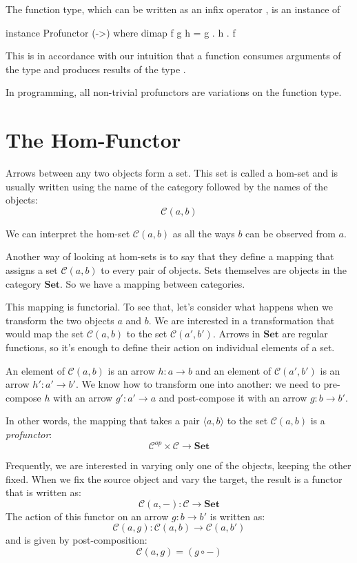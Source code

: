 \documentclass[DaoFP]{subfiles}
\begin{document}
The function type, which can be written as an infix operator \hask{(->)}, is an instance of 
\begin{haskell}
instance Profunctor (->) where
  dimap f g h = g . h . f
\end{haskell}
This is in accordance with our intuition that a function  consumes arguments of the type  and produces results of the type .

In programming, all non-trivial profunctors are variations on the function type. 

\section{The Hom-Functor}

Arrows between any two objects form a set. This set is called a hom-set and is usually written using the name of the category followed by the names of the objects:
\[ \mathcal{C}(a, b) \]

We can interpret the hom-set $\mathcal{C}(a, b)$ as all the ways $b$ can be observed from $a$. 

Another way of looking at hom-sets is to say that they define a mapping that assigns a set $\mathcal{C}(a, b)$ to every pair of objects. Sets themselves are objects in the category $\mathbf{Set}$. So we have a mapping between categories.

This mapping is functorial. To see that, let's consider what happens when we transform the two objects $a$ and $b$. We are interested in a transformation that would map the set $\mathcal{C}(a, b)$ to the set $\mathcal{C}(a', b')$. Arrows in $\mathbf{Set}$ are regular functions, so it's enough to define their action on individual elements of a set. 

An element of $\mathcal{C}(a, b)$ is an arrow $h \colon a \to b$ and an element of $\mathcal{C}(a', b')$ is an arrow $h' \colon a' \to b'$. We know how to transform one into another: we need to pre-compose $h$ with an arrow $g' \colon a' \to a$ and post-compose it with an arrow $g \colon b \to b'$. 

In other words, the mapping that takes a pair $\langle a, b \rangle$ to the set $\mathcal{C}(a, b)$ is a \emph{profunctor}:
\[ \mathcal{C}^{op} \times \mathcal{C} \to \mathbf{Set} \]

Frequently, we are interested in varying only one of the objects, keeping the other fixed. When we fix the source object and vary the target, the result is a functor  that is written as:
\[ \mathcal{C}(a, -) \colon \mathcal{C} \to \mathbf{Set} \]
The action of this functor on an arrow $g \colon b \to b'$ is written as:
\[ \mathcal{C}(a, g) \colon \mathcal{C}(a, b) \to \mathcal{C}(a, b') \]
and is given by post-composition:
\[\mathcal{C}(a, g) = (g \circ -) \]
\end{document}
